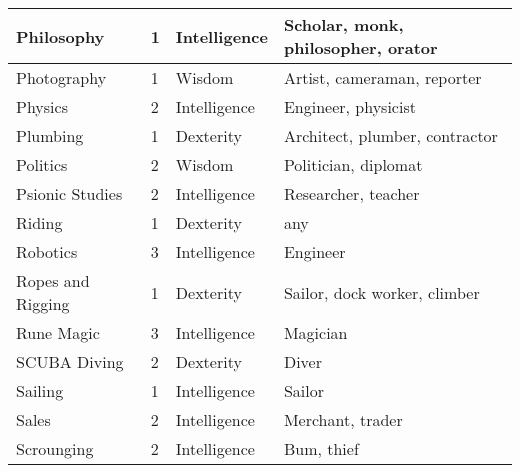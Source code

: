 \documentclass[twoside]{book}
\begin{document}
\begin{longtable}{p{1.25in}llp{12em}}
  \tabularnewline
  \hline
      
  \raggedright
           Philosophy 
  &
   1 
  &
   Intelligence 
  &
   Scholar, monk,
           philosopher, orator 
  \tabularnewline
  \hline
      
  \raggedright
           Photography 
  &
   1 
  &
   Wisdom 
  &
   Artist, cameraman,
           reporter 
  \tabularnewline
  \hline
      
  \raggedright
           Physics 
  &
   2 
  &
   Intelligence 
  &
   Engineer, physicist
           
  \tabularnewline
  \hline
      
  \raggedright
           Plumbing 
  &
   1 
  &
   Dexterity 
  &
   Architect, plumber,
           contractor 
  \tabularnewline
  \hline
      
  \raggedright
           Politics 
  &
   2 
  &
   Wisdom 
  &
   Politician, diplomat
           
  \tabularnewline
  \hline
      
  \raggedright
           Psionic Studies 
  &
   2 
  &
   Intelligence 
  &
   Researcher, teacher
           
  \tabularnewline
  \hline
      
  \raggedright
           Riding 
  &
   1 
  &
   Dexterity 
  &
   any 
  \tabularnewline
  \hline
      
  \raggedright
           Robotics 
  &
   3 
  &
   Intelligence 
  &
   Engineer 
  \tabularnewline
  \hline
      
  \raggedright
           Ropes and Rigging 
  &
   1 
  &
   Dexterity 
  &
   Sailor, dock worker,
           climber 
  \tabularnewline
  \hline
      
  \raggedright
           Rune Magic 
  &
   3 
  &
   Intelligence 
  &
   Magician 
  \tabularnewline
  \hline
      
  \raggedright
           SCUBA Diving 
  &
   2 
  &
   Dexterity 
  &
   Diver 
  \tabularnewline
  \hline
      
  \raggedright
           Sailing 
  &
   1 
  &
   Intelligence 
  &
   Sailor 
  \tabularnewline
  \hline
      
  \raggedright
           Sales 
  &
   2 
  &
   Intelligence 
  &
   Merchant, trader 
  \tabularnewline
  \hline
      
  \raggedright
           Scrounging 
  &
   2 
  &
   Intelligence 
  &
   Bum, thief 
  \tabularnewline
  \hline
      

\end{longtable}
\end{document}

